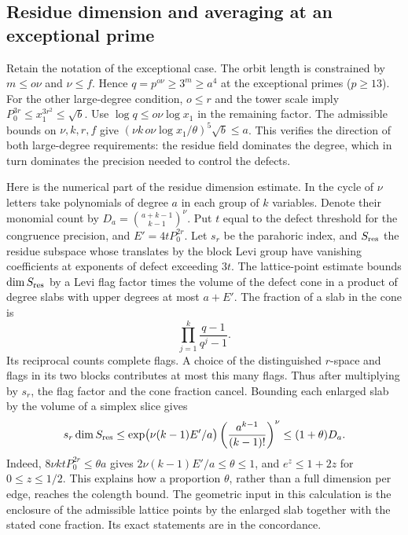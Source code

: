 \subsection{Residue dimension and averaging at an exceptional prime}\label{A:edgecalc}
Retain the notation of the exceptional case. The orbit length is constrained by $m\le o\nu$ and $\nu\le f$. Hence $q=p^{o\nu}\ge3^m\ge a^4$ at the exceptional primes ($p\ge13$). For the other large-degree condition, $o\le r$ and the tower scale imply $P_0^{3r}\le x_1^{3r^2}\le\sqrt b$. Use $\log q\le o\nu\log x_1$ in the remaining factor. The admissible bounds on $\nu,k,r,f$ give $(\nu k\,o\nu\log x_1/\theta)^5\sqrt b\le a$. This verifies the direction of both large-degree requirements: the residue field dominates the degree, which in turn dominates the precision needed to control the defects.

Here is the numerical part of the residue dimension estimate. In the cycle of $\nu$ letters take polynomials of degree $a$ in each group of $k$ variables. Denote their monomial count by $D_a=\binom{a+k-1}{k-1}^{\nu}$. Put $t$ equal to the defect threshold for the congruence precision, and $E'=4tP_0^{2r}$. Let $s_r$ be the parahoric index, and $S_{\rm res}$ the residue subspace whose translates by the block Levi group have vanishing coefficients at exponents of defect exceeding $3t$. The lattice-point estimate bounds $\dim S_{\rm res}$ by a Levi flag factor times the volume of the defect cone in a product of degree slabs with upper degrees at most $a+E'$. The fraction of a slab in the cone is
\[
 \prod_{j=1}^k \frac{q-1}{q^j-1}.
\]
Its reciprocal counts complete flags. A choice of the distinguished $r$-space and flags in its two blocks contributes at most this many flags. Thus after multiplying by $s_r$, the flag factor and the cone fraction cancel. Bounding each enlarged slab by the volume of a simplex slice gives
\[
 s_r\dim S_{\rm res}
 \le \exp\bigl(\nu(k-1)E'/a\bigr)
       \left(\frac{a^{k-1}}{(k-1)!}\right)^\nu
 \le (1+\theta)D_a.
\]
Indeed, $8\nu ktP_0^{2r}\le\theta a$ gives $2\nu(k-1)E'/a\le\theta\le1$, and $e^z\le1+2z$ for $0\le z\le1/2$. This explains how a proportion $\theta$, rather than a full dimension per edge, reaches the colength bound. The geometric input in this calculation is the enclosure of the admissible lattice points by the enlarged slab together with the stated cone fraction. Its exact statements are in the concordance.

